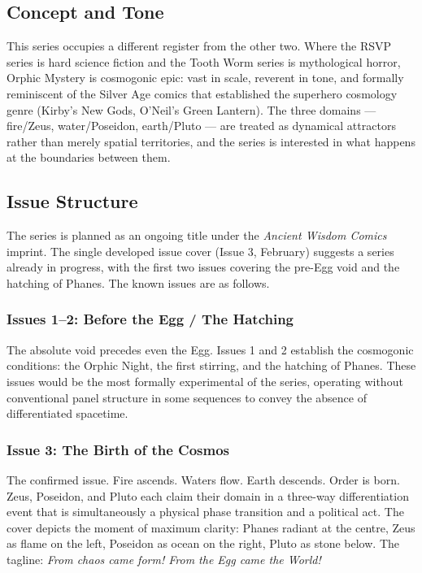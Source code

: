 \documentclass[12pt, a4paper]{article}
\begin{document}
\subsection{Concept and Tone}

This series occupies a different register from the other two. Where the RSVP series is hard science fiction and the Tooth Worm series is mythological horror, Orphic Mystery is cosmogonic epic: vast in scale, reverent in tone, and formally reminiscent of the Silver Age comics that established the superhero cosmology genre (Kirby's New Gods, O'Neil's Green Lantern). The three domains --- fire/Zeus, water/Poseidon, earth/Pluto --- are treated as dynamical attractors rather than merely spatial territories, and the series is interested in what happens at the boundaries between them.

\subsection{Issue Structure}

The series is planned as an ongoing title under the \textit{Ancient Wisdom Comics} imprint. The single developed issue cover (Issue 3, February) suggests a series already in progress, with the first two issues covering the pre-Egg void and the hatching of Phanes. The known issues are as follows.

\subsubsection{Issues 1--2: Before the Egg / The Hatching}

The absolute void precedes even the Egg. Issues 1 and 2 establish the cosmogonic conditions: the Orphic Night, the first stirring, and the hatching of Phanes. These issues would be the most formally experimental of the series, operating without conventional panel structure in some sequences to convey the absence of differentiated spacetime.

\subsubsection{Issue 3: The Birth of the Cosmos}

The confirmed issue. Fire ascends. Waters flow. Earth descends. Order is born. Zeus, Poseidon, and Pluto each claim their domain in a three-way differentiation event that is simultaneously a physical phase transition and a political act. The cover depicts the moment of maximum clarity: Phanes radiant at the centre, Zeus as flame on the left, Poseidon as ocean on the right, Pluto as stone below. The tagline: \textit{From chaos came form! From the Egg came the World!}
\end{document}
